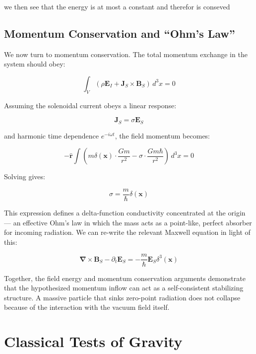 \documentclass {article}
\renewcommand\vec{\mathbf}
\let\OldS\nabla
\renewcommand{\nabla}{\boldsymbol{\OldS}}
\let\OldHat\hat
\renewcommand{\hat}[1]{\OldHat{\mathbf{#1}}}
\begin{document}
 we then see that the energy is at most a constant and therefor is conseved 


\subsection{Momentum Conservation and “Ohm’s Law”}

We now turn to momentum conservation. The total momentum exchange in the system should obey:

\begin{equation}
\int_V \left( \rho \vec{E}_I + \vec{J}_S \times \vec{B}_S \right) \, d^3x = 0
\end{equation}


Assuming the solenoidal current obeys a linear response:

\begin{equation}
\vec{J}_S = \sigma \vec{E}_S
\end{equation}

and harmonic time dependence \(e^{-i \omega t}\), the field momentum becomes:

\begin{equation}
-\hat{r} \int \left( m \delta(\vec{x}) \cdot \frac{G m}{r^2} - \sigma \cdot \frac{G m \hbar}{r^2} \right) \, d^3x = 0
\end{equation}

Solving gives:

\begin{equation}
\sigma = \frac{m}{\hbar} \delta(\vec{x})
\end{equation}

This expression defines a delta-function conductivity concentrated at the origin — an effective Ohm's law in which the mass acts as a point-like, perfect absorber for incoming radiation.  We can re-write the relevant Maxwell equation in light of this:

\begin{equation}
\nabla \times \vec{B}_S - \partial_t \vec{E}_S = -\frac{m}{\hbar} \vec{E}_S \delta^3(\vec{x})
\label{eq:ohm}
\end{equation}



Together, the field energy and momentum conservation arguments demonstrate that the hypothesized momentum inflow can act as a self-consistent stabilizing structure. A massive particle that sinks zero-point radiation does not collapse because of the interaction with the vacuum field itself.

	
\section{Classical Tests of Gravity}
\end{document}
